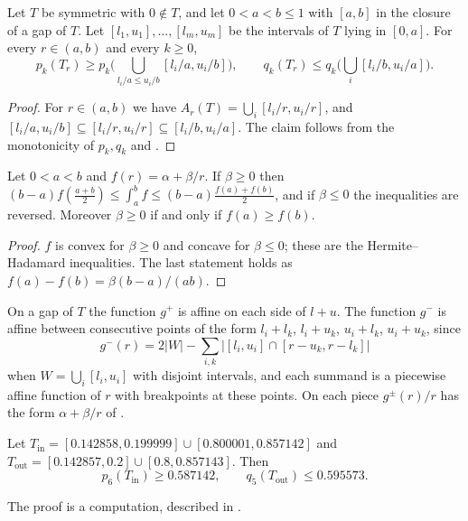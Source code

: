 \documentclass[11pt,colorlinks]{charlie}
\newcommand{\Tin}{T_{\mathrm{in}}}
\newcommand{\Tout}{T_{\mathrm{out}}}
\begin{document}
\begin{lemma}[Cells]\label{lem:cells}
Let $T$ be symmetric with $0\notin T$, and let $0<a<b\le1$ with $[a,b]$ in the closure of a gap of $T$. Let $[l_1,u_1],\dots,[l_m,u_m]$ be the intervals of $T$ lying in $[0,a]$. For every $r\in(a,b)$ and every $k\ge0$,
\[
 p_k(T_r)\ge p_k\Big(\bigcup_{l_i/a\le u_i/b}[l_i/a,u_i/b]\Big),\qquad q_k(T_r)\le q_k\Big(\bigcup_{i}[l_i/b,u_i/a]\Big).
\]
\end{lemma}

\begin{proof}
For $r\in(a,b)$ we have $A_r(T)=\bigcup_i[l_i/r,u_i/r]$, and $[l_i/a,u_i/b]\subseteq[l_i/r,u_i/r]\subseteq[l_i/b,u_i/a]$. The claim follows from the monotonicity of $p_k,q_k$ and .
\end{proof}

\begin{lemma}\label{lem:HH}
Let $0<a<b$ and $f(r)=\alpha+\beta/r$. If $\beta\ge0$ then $(b-a)f(\frac{a+b}2)\le\int_a^bf\le(b-a)\frac{f(a)+f(b)}2$, and if $\beta\le0$ the inequalities are reversed. Moreover $\beta\ge0$ if and only if $f(a)\ge f(b)$.
\end{lemma}

\begin{proof}
$f$ is convex for $\beta\ge0$ and concave for $\beta\le0$; these are the Hermite--Hadamard inequalities. The last statement holds as $f(a)-f(b)=\beta(b-a)/(ab)$.
\end{proof}

On a gap of $T$ the function $g^+$ is affine on each side of $l+u$. The function $g^-$ is affine between consecutive points of the form $l_i+l_k$, $l_i+u_k$, $u_i+l_k$, $u_i+u_k$, since
\[
 g^-(r)=2|W|-\sum_{i,k}\big|[l_i,u_i]\cap[r-u_k,r-l_k]\big|
\]
when $W=\bigcup_i[l_i,u_i]$ with disjoint intervals, and each summand is a piecewise affine function of $r$ with breakpoints at these points. On each piece $g^\pm(r)/r$ has the form $\alpha+\beta/r$ of .

\begin{proposition}\label{prop:numerics}
Let $\Tin=[0.142858,0.199999]\cup[0.800001,0.857142]$ and $\Tout=[0.142857,0.2]\cup[0.8,0.857143]$. Then
\[
 p_6(\Tin)\ge0.587142,\qquad q_5(\Tout)\le0.595573 .
\]
\end{proposition}

The proof is a computation, described in .
\end{document}
